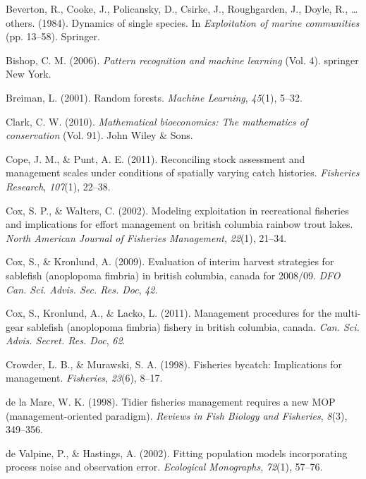 \documentclass[12pt,]{scrartcl}
\begin{document}
\hypertarget{ref-beverton1984dynamics}{}
Beverton, R., Cooke, J., Policansky, D., Csirke, J., Roughgarden, J.,
Doyle, R., \ldots{} others. (1984). Dynamics of single species. In
\emph{Exploitation of marine communities} (pp. 13--58). Springer.

\hypertarget{ref-bishop2006pattern}{}
Bishop, C. M. (2006). \emph{Pattern recognition and machine learning}
(Vol. 4). springer New York.

\hypertarget{ref-breiman2001random}{}
Breiman, L. (2001). Random forests. \emph{Machine Learning},
\emph{45}(1), 5--32.

\hypertarget{ref-clark2010mathematical}{}
Clark, C. W. (2010). \emph{Mathematical bioeconomics: The mathematics of
conservation} (Vol. 91). John Wiley \& Sons.

\hypertarget{ref-cope2011reconciling}{}
Cope, J. M., \& Punt, A. E. (2011). Reconciling stock assessment and
management scales under conditions of spatially varying catch histories.
\emph{Fisheries Research}, \emph{107}(1), 22--38.

\hypertarget{ref-cox2002modeling}{}
Cox, S. P., \& Walters, C. (2002). Modeling exploitation in recreational
fisheries and implications for effort management on british columbia
rainbow trout lakes. \emph{North American Journal of Fisheries
Management}, \emph{22}(1), 21--34.

\hypertarget{ref-cox2009evaluation}{}
Cox, S., \& Kronlund, A. (2009). Evaluation of interim harvest
strategies for sablefish (anoplopoma fimbria) in british columbia,
canada for 2008/09. \emph{DFO Can. Sci. Advis. Sec. Res. Doc},
\emph{42}.

\hypertarget{ref-cox2011management}{}
Cox, S., Kronlund, A., \& Lacko, L. (2011). Management procedures for
the multi-gear sablefish (anoplopoma fimbria) fishery in british
columbia, canada. \emph{Can. Sci. Advis. Secret. Res. Doc}, \emph{62}.

\hypertarget{ref-crowder1998fisheries}{}
Crowder, L. B., \& Murawski, S. A. (1998). Fisheries bycatch:
Implications for management. \emph{Fisheries}, \emph{23}(6), 8--17.

\hypertarget{ref-de-la-Mare1998Tidier-fisherie}{}
de la Mare, W. K. (1998). Tidier fisheries management requires a new MOP
(management-oriented paradigm). \emph{Reviews in Fish Biology and
Fisheries}, \emph{8}(3), 349--356.

\hypertarget{ref-de2002fitting}{}
de Valpine, P., \& Hastings, A. (2002). Fitting population models
incorporating process noise and observation error. \emph{Ecological
Monographs}, \emph{72}(1), 57--76.
\end{document}
